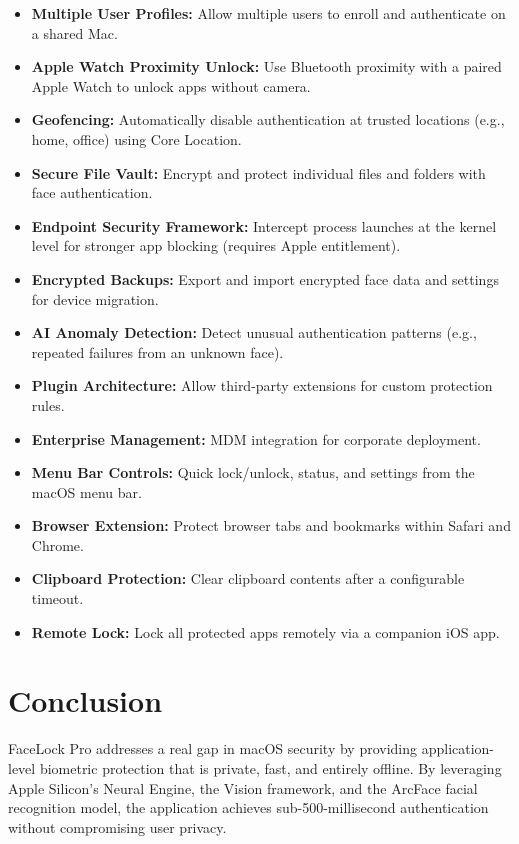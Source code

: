 \documentclass[12pt,a4paper]{report}
\begin{document}
\begin{itemize}
    \item \textbf{Multiple User Profiles:} Allow multiple users to enroll and authenticate on a shared Mac.
    \item \textbf{Apple Watch Proximity Unlock:} Use Bluetooth proximity with a paired Apple Watch to unlock apps without camera.
    \item \textbf{Geofencing:} Automatically disable authentication at trusted locations (e.g., home, office) using Core Location.
    \item \textbf{Secure File Vault:} Encrypt and protect individual files and folders with face authentication.
    \item \textbf{Endpoint Security Framework:} Intercept process launches at the kernel level for stronger app blocking (requires Apple entitlement).
    \item \textbf{Encrypted Backups:} Export and import encrypted face data and settings for device migration.
    \item \textbf{AI Anomaly Detection:} Detect unusual authentication patterns (e.g., repeated failures from an unknown face).
    \item \textbf{Plugin Architecture:} Allow third-party extensions for custom protection rules.
    \item \textbf{Enterprise Management:} MDM integration for corporate deployment.
    \item \textbf{Menu Bar Controls:} Quick lock/unlock, status, and settings from the macOS menu bar.
    \item \textbf{Browser Extension:} Protect browser tabs and bookmarks within Safari and Chrome.
    \item \textbf{Clipboard Protection:} Clear clipboard contents after a configurable timeout.
    \item \textbf{Remote Lock:} Lock all protected apps remotely via a companion iOS app.
\end{itemize}

\chapter{Conclusion}

FaceLock Pro addresses a real gap in macOS security by providing application-level biometric protection that is private, fast, and entirely offline. By leveraging Apple Silicon's Neural Engine, the Vision framework, and the ArcFace facial recognition model, the application achieves sub-500-millisecond authentication without compromising user privacy.
\end{document}
